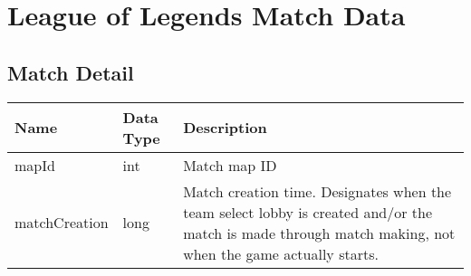 \section{League of Legends Match Data}

\subsection{Match Detail}
\begin{table}[!h]
\tiny
\centering
\begin{tabular}{llp{5cm}}
\textbf{Name}         & \textbf{Data Type}            & \textbf{Description}                                                                                                                                                                                                                                                                                                                                                                                                                                                                                                                                                                                                                    \\ \hline
mapId                 & int                           & Match map ID                                                                                                                                                                                                                                                                                                                                                                                                                                                                                                                                                                                                                            \\ \hline
matchCreation         & long                          & Match creation time. Designates when the team select lobby is created and/or the match is made through match making, not when the game actually starts.                                                                                                                                                                                                                                                                                                                                                                                                                                                                                 \\ \hline

\end{tabular}
\end{table}
